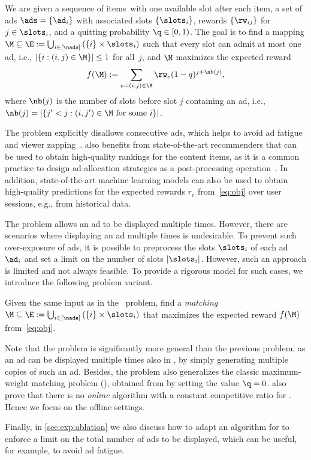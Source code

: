 \begin{problem}[\streamadsr]\label{problem:adsr}
	We are given a sequence of \nV items~\V with one available slot after each item, 
	a set of \nads ads $\ads = \{ \ad_i \}$ with associated slots $\{ \slots_i \}$,  
	rewards $\{ \rw_{ij} \}$ for $j \in \slots_i$, and a quitting probability  $\q\in[0,1)$.
	The goal is to find a mapping 
	$\M \subseteq \E := \bigcup_{i \in [\nads]} \left(\{ i \} \times \slots_i\right)$ 
	such that every slot can admit at most one ad, i.e.,
	$|\{ i : (i, j) \in \M \}| \le 1$ for all~$j$, 
	and $\M$ maximizes the expected reward
	\begin{align}
		f(\M) := \sum_{e=(i,j) \in \M} \rw_{e} (1-q)^{j + \nb(j)}, \label{eq:obj}
	\end{align}
	where $\nb(j)$ is the number of slots before slot $j$ containing an ad,
	i.e.,
	$\nb(j) = |\{ j' < j : (i, j') \in \M \text{ for some } i \}|$.
\end{problem}

The \streamadsr problem explicitly disallows consecutive ads, 
which helps to avoid ad fatigue
and viewer zapping~\citep{shi2023much}.
\streamadsr also benefits from state-of-the-art recommenders that can be used to obtain high-quality rankings for the content items, as it is a common practice to design  ad-allocation strategies
as a post-processing operation~\citep{yan2020ads,li2024deep}. 
In addition, state-of-the-art machine learning models can also be used to obtain high-quality predictions for the expected rewards $r_e$ from~\cref{eq:obj} over user sessions, e.g., from historical data. %

The \streamadsr problem allows an ad to be displayed multiple times.
However, there are scenarios where displaying an ad multiple times is undesirable.
To prevent such over-exposure of ads,
it is possible to preprocess the slots $\slots_i$ of each ad $\ad_i$
and set a limit on the number of slots $|\slots_i|$.
However, such an approach is limited and not always feasible.
To provide a rigorous model for such cases, 
we introduce the following problem variant.

\begin{problem}[\streamads]\label{problem:ads}
	Given the same input as in the \streamadsr\ problem,
	find a \emph{matching} $\M \subseteq \E := \bigcup_{i \in [\nads]} \left(\{ i \} \times \slots_i\right)$ 
	that maximizes the expected reward $f(\M)$ from~\cref{eq:obj}. %
\end{problem}

Note that the \streamads problem is significantly more general than the previous \streamadsr problem, 
as an ad can be 
displayed multiple times also in \streamads, by simply generating multiple copies of such an ad.
Besides, the \streamads problem also generalizes the classic maximum-weight matching problem (\mwm),
obtained from \streamads by setting the value $\q=0$.
\citet{ieong2014advertising} also prove that there is no \emph{online} algorithm with a constant competitive ratio for \streamads. 
Hence we focus on the offline settings. 

Finally, in \cref{sec:exp:ablation}
we also discuss how to adapt an algorithm for \streamads 
to %
enforce a limit on the total number of ads to be displayed,
which can be useful, for example, to avoid ad fatigue. %

